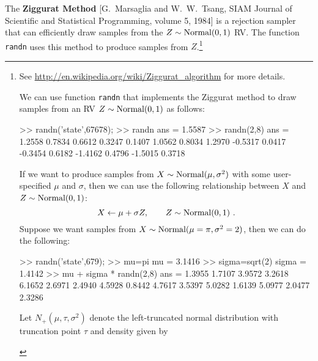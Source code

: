 The {\bf Ziggurat Method} [G.~Marsaglia and W.~W.~Tsang, SIAM Journal of Scientific and Statistical Programming, volume 5, 1984] is a rejection sampler that can efficiently draw samples from the $Z \sim \mbox{{\rm Normal}}(0,1)$ RV.  The \Matlab function {\tt randn} uses this method to produce samples from $Z$.\footnote{{\tiny See \href{http://en.wikipedia.org/wiki/Ziggurat_algorithm}{\url{http://en.wikipedia.org/wiki/Ziggurat_algorithm}} for more details.}

\begin{labwork}\label{LW:randn}
We can use \Matlab function {\tt randn} that implements the Ziggurat method to draw samples from an RV $Z \sim \mbox{{\rm Normal}}(0,1)$ as follows:
\begin{VrbM}
>> randn('state',67678); %
>> randn %
ans =    1.5587
>> randn(2,8) %
ans =
    1.2558    0.7834    0.6612    0.3247    0.1407    1.0562    0.8034    1.2970
   -0.5317    0.0417   -0.3454    0.6182   -1.4162    0.4796   -1.5015    0.3718
\end{VrbM}
If we want to produce samples from $X \sim \mbox{{\rm Normal}}(\mu,\sigma^2)$ with some user-specified $\mu$ and $\sigma$, then we can use the following relationship between $X$ and $Z \sim \mbox{{\rm Normal}}(0,1)$:
\[
X \gets \mu + \sigma Z, \qquad Z \sim \mbox{{\rm Normal}}(0,1) \ .
\]
Suppose we want samples from $X \sim \mbox{{\rm Normal}}(\mu=\pi, \sigma^2=2)$, then we can do the following:
\begin{VrbM}
>> randn('state',679); %
>> mu=pi %
mu =    3.1416
>> sigma=sqrt(2) %
sigma =    1.4142
>> mu + sigma * randn(2,8) %
ans =
    1.3955    1.7107    3.9572    3.2618    6.1652    2.6971    2.4940    4.5928
    0.8442    4.7617    3.5397    5.0282    1.6139    5.0977    2.0477    2.3286
\end{VrbM}
\end{labwork}

\begin{labwork}
Let $N_+(\mu,\tau,\sigma^2)$ denote the left-truncated normal distribution with truncation point $\tau$ and density given by


\end{labwork}}
